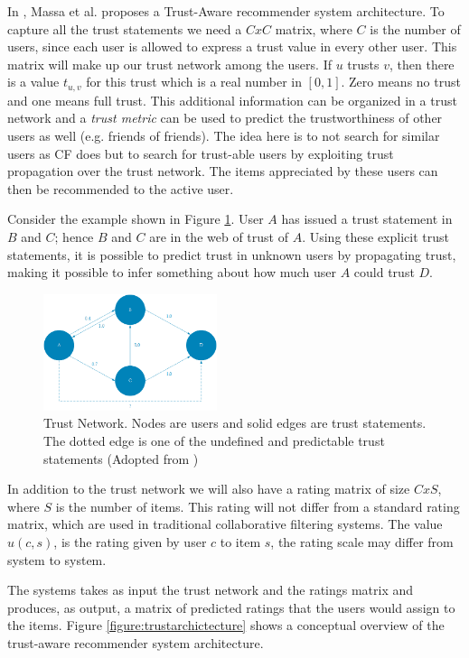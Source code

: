 In \cite{Massa2004}, Massa et al. proposes a Trust-Aware recommender system
architecture.  To capture all the trust statements we need a $CxC$ matrix,
where $C$ is the number of users, since each user is allowed to express a trust
value in every other user. This matrix will make up our trust network among the
users. If $u$ trusts $v$, then there is a value $t_{u,v}$ for this trust which
is a real number in $[0,1]$. Zero means no trust and one means full trust. This
additional information can be organized in a trust network and a \emph{trust
metric} can be used to predict the trustworthiness of other users as well
(e.g. friends of friends). The idea here is to not search for similar users
as CF does but to search for trust-able users by exploiting trust propagation
over the trust network. The items appreciated by these users can then be
recommended to the active user.

Consider the example shown in Figure \ref{figure:weboftrust}. User $A$ has
issued a trust statement in $B$ and $C$; hence $B$ and $C$ are in the web of
trust of $A$. Using these explicit trust statements, it is possible to predict
trust in unknown users by propagating trust, making it possible to infer
something about how much user $A$ could trust $D$.

\begin{figure}[H]
    \includegraphics[width=2in]{image/webofTrust.png}
    \centering
    \caption[Trust Network]{Trust Network. Nodes are users and solid edges are trust statements. The dotted edge is one of the undefined and predictable trust statements (Adopted from \cite{Massa2004})}
    \label{figure:weboftrust}
\end{figure}

In addition to the trust network we will also have a rating matrix of size
$CxS$, where $S$ is the number of items. This rating will not differ from a
standard rating matrix, which are used in traditional collaborative filtering
systems. The value $u(c,s)$, is the rating given by user $c$ to item $s$, the
rating scale may differ from system to system.

The systems takes as input the trust network and the ratings matrix and
produces, as output, a matrix of predicted ratings that the users would assign
to the items. Figure \ref{figure:trustarchictecture} shows a conceptual
overview of the trust-aware recommender system architecture.


